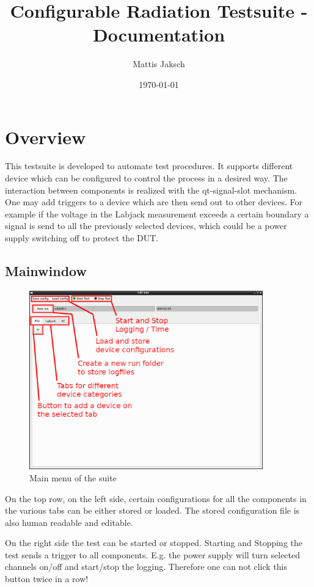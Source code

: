 \documentclass[10pt,a4paper]{article}
\title{Configurable Radiation Testsuite - Documentation}
\author{Mattis Jaksch}
\date{\today}
\begin{document}
\maketitle

\tableofcontents

\section{Overview}
This testsuite is developed to automate test procedures. It supports different device which can be configured to control the process in a desired way. The interaction between components is realized with the qt-signal-slot mechanism. One may add triggers to a device which are then send out to other devices. For example if the voltage in the Labjack measurement exceeds a certain boundary a signal is send to all the previously selected devices, which could be a power supply switching off to protect the DUT.

	\subsection{Mainwindow}
	
	\begin{figure}[H]
	\centering
	\includegraphics[width=0.9\textwidth]{./1_Plain_Expl.png}
	\caption{Main menu of the suite}
	\end{figure}
	
	On the top row, on the left side, certain configurations for all the components in the various tabs can be either stored or loaded. The stored configuration file is also human readable and editable.
	
	On the right side the test can be started or stopped. Starting and Stopping the test sends a trigger to all components. E.g. the power supply will turn selected channels on/off and start/stop the logging. Therefore one can not click this button twice in a row!
	
\end{document}
